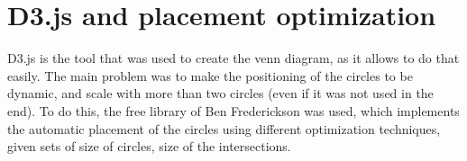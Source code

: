 \section{D3.js and placement optimization}
D3.js is the tool that was used to create the venn diagram, as it allows to do that easily. The main problem was to make the positioning of the circles to be dynamic, and scale with more than two circles (even if it was not used in the end). To do this, the free library of Ben Frederickson was used, which implements the automatic placement of the circles using different optimization techniques, given sets of size of circles, size of the intersections.

